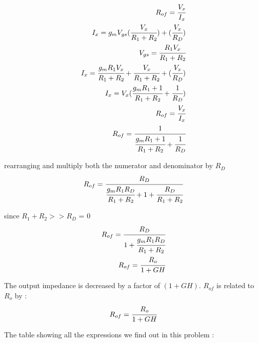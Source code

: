 \begin{enumerate}[label=\arabic*.,ref=\theenumi]
\begin{align}
R_{of} = \cfrac{V_{x}}{I_{x}}\\
I_{x} = g_{m}V_{gs}(\cfrac{V_{x}}{R_{1}+R_{2}})+(\cfrac{V_{x}}{R_{D}})\\
V_{gs} = \cfrac{R_{1}V_{x}}{R_{1}+R_{2}}\\
I_{x} = \cfrac{g_{m}R_{1}V_{x}}{R_{1}+R_{2}}+\cfrac{V_{x}}{R_{1}+R_{2}}+(\cfrac{V_{x}}{R_{D}})\\
I_{x} = V_{x}(\cfrac{g_{m}R_{1}+1}{R_{1}+R_{2}} + \cfrac{1}{R_{D}})\\
R_{of} = \cfrac{V_{x}}{I_{x}}\\ R_{of} = \cfrac{1}{\cfrac{g_{m}R_{1}+1}{R_{1}+R_{2}}+\cfrac{1}{R_{D}}}
\end{align}



rearranging and multiply both the numerator and denominator by $R_{D}$\\

\begin{align}
R_{of} = \cfrac{R_{D}}{\cfrac{g_{m}R_{1}R_{D}}{R_{1}+R_{2}}+1+\cfrac{R_{D}}{R_{1}+R_{2}}}
\end{align}

since $R_{1}+R_{2}>>R_{D}$ \implies {} = 0\\

\begin{align}
R_{of} = \cfrac{R_{D}}{1 + \cfrac{ g_{m}R_{1}R_{D}}{R_{1}+R_{2}}}\\
R_{of} = \cfrac{R_{o}}{1 + GH}
\end{align}

The output impedance is decreased by a factor of $(1+GH)$.
$R_{of}$ is related to $R_{o}$ by :\\
\begin{align}
R_{of} = \cfrac{R_{o}}{1 + GH}
\end{align}


The table showing all the expressions we find out in this problem :

\begin{table}[!ht]
\centering

\caption{}
\label{table}
\end{table}


\end{enumerate}
